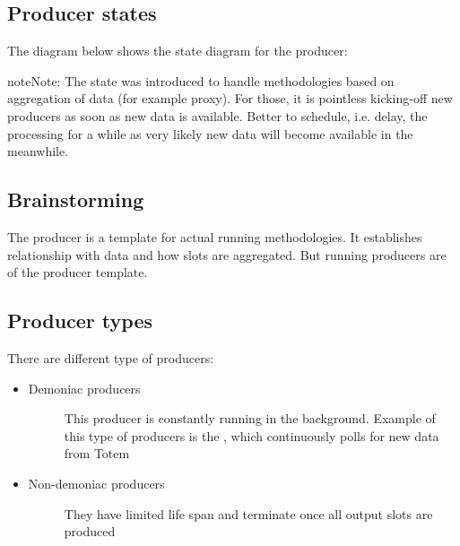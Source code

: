 \documentclass[letterpaper,10pt,english]{sphinxmanual}
\begin{document}
\subsection{Producer states}
\label{\detokenize{slot_prod:producer-states}}
The diagram below shows the state diagram for the producer:

\begin{sphinxadmonition}{note}{Note:}
The  state was introduced to handle methodologies
based on aggregation of data (for example proxy). For those, it is
pointless kicking-off new producers as soon as new data is available.
Better to schedule, i.e. delay, the processing for a while as very
likely new data will become available in the meanwhile.
\end{sphinxadmonition}



\subsection{Brainstorming}
\label{\detokenize{slot_prod:id1}}
The producer is a template for actual running methodologies. It establishes
relationship with data and how slots are aggregated. But running producers are
 of the producer template.


\subsection{Producer types}
\label{\detokenize{slot_prod:producer-types}}
There are different type of producers:
\begin{itemize}
\item {} \begin{description}
\item[{Demoniac producers}] \leavevmode
This producer is constantly running in the background. Example of this type
of producers is the , which continuously polls for new data
from Totem

\end{description}

\item {} \begin{description}
\item[{Non-demoniac producers}] \leavevmode
They have limited life span and terminate once all output slots are produced

\end{description}

\end{itemize}
\end{document}
